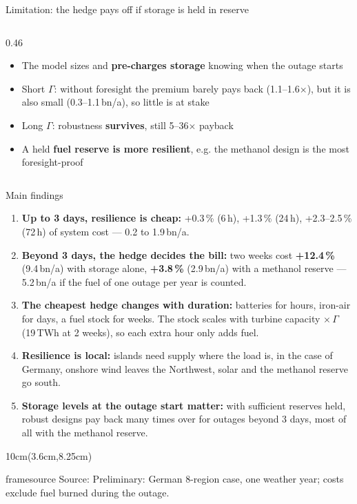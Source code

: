 \documentclass[10pt,aspectratio=169,dvipsnames]{beamer}
\newcommand{\source}[1]{\begin{textblock*}{10cm}(3.6cm,8.25cm)
    \begin{beamercolorbox}[ht=0.5cm,right]{framesource}
        \usebeamerfont{framesource}\usebeamercolor[fg]{framesource} Source: {#1}
    \end{beamercolorbox}
\end{textblock*}}
\begin{document}
{\begin{frame}{Limitation: the hedge pays off if storage is held in reserve}
\begin{columns}[T,onlytextwidth]
\begin{column}{0.46\textwidth}
			  \begin{itemize}\setlength{\itemsep}{0.4em}
				  \item The model sizes and \textbf{pre-charges storage} knowing when the outage starts
				  \item Short $\Gamma$: without foresight the premium barely pays back (1.1--1.6$\times$), but it is also small (0.3--1.1\,bn\texteuro/a), so
				        little is at stake
				  \item Long $\Gamma$: robustness \textbf{survives}, still 5--36$\times$ payback
				  \item A held \textbf{fuel reserve is more resilient}, e.g. the methanol design is the most foresight-proof
			  \end{itemize}
		  \end{column}
	  \end{columns}
  \end{frame}}

 {
  \begin{frame}{Main findings}
	  \vspace{-0.4em}
	  \begin{enumerate}\setlength{\itemsep}{0.55em}
		  \item \textbf{Up to 3 days, resilience is cheap:} +0.3\,\% (6\,h), +1.3\,\% (24\,h),
		        +2.3--2.5\,\% (72\,h) of system cost --- 0.2 to 1.9\,bn\texteuro/a.
		  \item \textbf{Beyond 3 days, the hedge decides the bill:} two weeks cost
		        \textbf{+12.4\,\%} (9.4\,bn\texteuro/a) with storage alone, \textbf{+3.8\,\%}
		        (2.9\,bn\texteuro/a) with a methanol reserve --- 5.2\,bn\texteuro/a if the
		        fuel of one outage per year is counted.
		  \item \textbf{The cheapest hedge changes with duration:} batteries for hours, iron-air for
		        days, a fuel stock for weeks. The stock scales with turbine capacity $\times\,\Gamma$
		        (19\,TWh at 2 weeks), so each extra hour only adds fuel.
		  \item \textbf{Resilience is local:} islands need supply where the load is, in the case of Germany, onshore wind leaves the Northwest, solar and the methanol reserve go south.
		  \item \textbf{Storage levels at the outage start matter:} with sufficient reserves
		        held, robust designs pay back many times over for outages beyond 3 days, most of all with the methanol reserve.
	  \end{enumerate}
	  \source{Preliminary: German 8-region case, one weather year; costs exclude fuel burned during
		  the outage.}
  \end{frame}}
\end{document}
